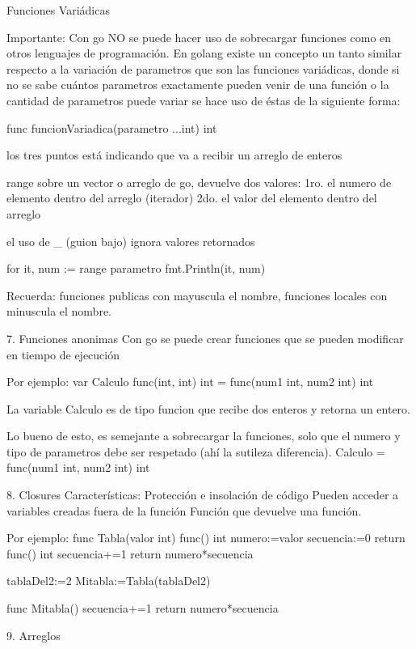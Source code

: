 Funciones Variádicas

Importante:
Con go NO se puede hacer uso de sobrecargar funciones como en otros lenguajes de programación. En golang existe un concepto un tanto
similar respecto a la variación de parametros que son las funciones
variádicas, donde si no se sabe cuántos parametros exactamente pueden
venir de una función o la cantidad de parametros puede variar se hace 
uso de éstas de la siguiente forma:

func funcionVariadica(parametro ...int) int{

}
los tres puntos está indicando que va a recibir un arreglo de enteros

range sobre un vector o arreglo de go, devuelve dos valores:
    1ro. el numero de elemento dentro del arreglo (iterador)
    2do. el valor del elemento dentro del arreglo

el uso de _ (guion bajo) ignora valores retornados 

for it, num := range parametro{
    fmt.Println(it, num)
}

Recuerda: funciones publicas con mayuscula el nombre, funciones locales 
con minuscula el nombre.


7. Funciones anonimas
Con go se puede crear funciones que se pueden modificar en tiempo de ejecución

Por ejemplo: 
    var Calculo func(int, int) int = func(num1 int, num2 int) int{

    }
La variable Calculo es de tipo funcion que recibe dos enteros y retorna un entero. 

Lo bueno de esto, es semejante a sobrecargar la funciones, solo que el numero y tipo de parametros debe ser respetado (ahí la sutileza diferencia).
    Calculo = func(num1 int, num2 int) int{

    }

8. Closures
Características:
    Protección e insolación de código
    Pueden acceder a variables creadas fuera de la función
    Función que devuelve una función.

Por ejemplo:
    func Tabla(valor int) func() int{
        numero:=valor 
        secuencia:=0
        return func() int{
            secuencia+=1  
            return numero*secuencia
        }
    }


	tablaDel2:=2
	Mitabla:=Tabla(tablaDel2)

    func Mitabla() {
		secuencia+=1  
		return numero*secuencia
	}


9. Arreglos 

